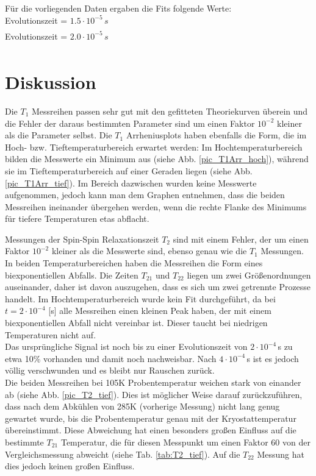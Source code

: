 Für die vorliegenden Daten ergaben die Fits folgende Werte: 
\\
Evolutionszeit = $1.5\cdot10^{-5}\,s$
\begin{align*}
	
\end{align*}
Evolutionszeit = $2.0\cdot10^{-5}\,s$
\begin{align*}
		
\end{align*}

\section{Diskussion}
Die $T_1$ Messreihen passen sehr gut mit den gefitteten Theoriekurven überein und die Fehler der daraus bestimmten Parameter sind um einen Faktor $10^{-2}$ kleiner als die Parameter selbst.
Die $T_1$ Arrheniusplots haben ebenfalls die Form, die im Hoch- bzw. Tieftemperaturbereich erwartet werden: Im Hochtemperaturbereich bilden die Messwerte ein Minimum aus (siehe Abb. \ref{pic_T1Arr_hoch}), während sie im Tieftemperaturbereich auf einer Geraden liegen (siehe Abb. \ref{pic_T1Arr_tief}). Im Bereich dazwischen wurden keine Messwerte aufgenommen, jedoch kann man dem Graphen entnehmen, dass die beiden Messreihen ineinander übergehen werden, wenn die rechte Flanke des Minimums für tiefere Temperaturen etas abflacht. 

Messungen der Spin-Spin Relaxationszeit $T_2$ sind mit einem Fehler, der um einen Faktor $10^{-2}$ kleiner als die Messwerte sind, ebenso genau wie die $T_1$ Messungen. In beiden Temperaturbereichen haben die Messreihen die Form eines biexponentiellen Abfalls. Die Zeiten $T_{21}$ und $T_{22}$ liegen um zwei Größenordnungen auseinander, daher ist davon auszugehen, dass es sich um zwei getrennte Prozesse handelt.
Im Hochtemperaturbereich wurde kein Fit durchgeführt, da bei $t = 2\cdot 10^{-4}$ [s] alle Messreihen einen kleinen Peak haben, der mit einem biexponentiellen Abfall nicht vereinbar ist. Dieser taucht bei niedrigen Temperaturen nicht auf.\\
Das ursprüngliche Signal ist noch bis zu einer Evolutionszeit von $2\cdot 10^{-4}$\,s zu etwa 10\% vorhanden und damit noch nachweisbar. Nach $4\cdot 10^{-4}$\,s ist es jedoch völlig verschwunden und es bleibt nur Rauschen zurück.\\
Die beiden Messreihen bei 105K Probentemperatur weichen stark von einander ab (siehe Abb. \ref{pic_T2_tief}). Dies ist möglicher Weise darauf zurückzuführen, dass nach dem Abkühlen von 285K (vorherige Messung) nicht lang genug gewartet wurde, bis die Probentemperatur genau mit der Kryostattemperatur übereinstimmt. Diese Abweichung hat einen besonders großen Einfluss auf die bestimmte $T_{21}$ Temperatur, die für diesen Messpunkt um einen Faktor 60 von der Vergleichsmessung abweicht (siehe Tab. \ref{tab:T2_tief}). Auf die $T_{22}$ Messung hat dies jedoch keinen großen Einfluss.

